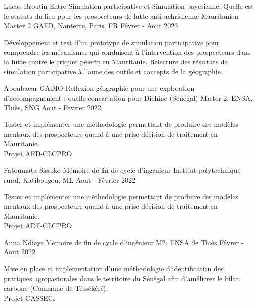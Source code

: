 \begin{cventries}
    \cventry
        {Lucas Broutin} %
        {Entre Simulation participative et Simulation bayesienne. Quelle est le statuts du lieu pour les prospecteurs de lutte anti-achridienne Mauritanien} %
        {Master 2 GAED, Nanterre, Paris, FR} %
        {Févrer - Aout 2023} %
        {
        \begin{cvitems} %
          Développement et test d'un prototype de simulation participative pour comprendre les mécanismes qui conduisent à l'intervention des prospecteurs dans la lutte contre le criquet pèlerin en Mauritanie. Relecture des résultats de simulation participative à l'aune des outils et concepts de la géographie.
        \end{cvitems}
        }


    \cventry
        {Aboubacar GADIO} %
        {Reflexion géographie pour une exploration d'accompagnement ; quelle concertation pour Diohine (Sénégal)} %
        {Master 2, ENSA, Thiès, SNG} %
        {Aout - Fevrier 2022} %
        {
        \begin{cvitems} %
            Tester et implémenter une méthodologie permettant de produire des modèles mentaux des prospecteurs quand à une prise décision de traitement en Mauritanie.\\
            Projet AFD-CLCPRO
        \end{cvitems}
        }


    \cventry
        {Fatoumata Sissoko} %
        {Mémoire de fin de cycle d'ingénieur} %
        {Institut polytechnique rural, Katibougou, ML} %
        {Aout - Février 2022} %
        {
        \begin{cvitems} %
            Tester et implémenter une méthodologie permettant de produire des modèles mentaux des prospecteurs quand à une prise décision de traitement en Mauritanie.\\
            Projet ADF-CLCPRO
        \end{cvitems}
        }


    \cventry
        {Anna Ndiaye} %
        {Mémoire de fin de cycle d'ingénieur} %
        {M2, ENSA de Thiès} %
        {Févrer - Aout 2022} %
        {
        \begin{cvitems} %
            Mise en place et implémentation d'une méthodologie d'identification des pratiques agropastorales dans le territoire du Sénégal afin d’améliorer le bilan carbone (Commune de Téssékéré).\\
            Projet CASSECs
        \end{cvitems}
        }



\end{cventries}

